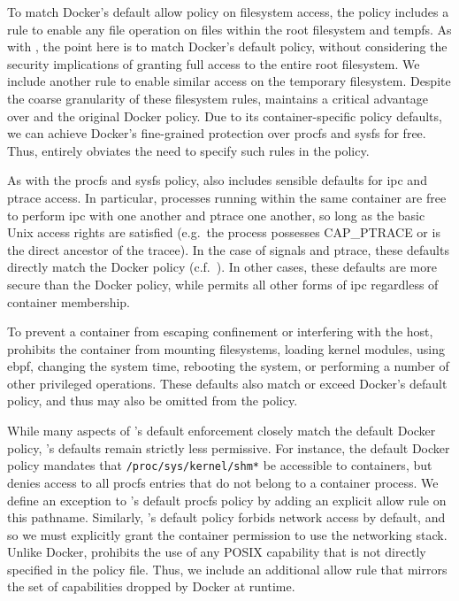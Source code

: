 To match Docker's default allow policy on filesystem access, the \bpfcontain{} policy
includes a rule to enable any file operation on files within the root filesystem and
tempfs.  As with \bpfbox{}, the point here is to match Docker's default policy, without
considering the security implications of granting full access to the entire root
filesystem. We include another rule to enable similar access on the temporary filesystem.
Despite the coarse granularity of these filesystem rules, \bpfcontain{} maintains
a critical advantage over \bpfbox{} and the original Docker policy. Due to its
container-specific policy defaults, we can achieve Docker's fine-grained protection over
procfs and sysfs for free. Thus, \bpfcontain{} entirely obviates the need to specify such
rules in the policy.

As with the procfs and sysfs policy, \bpfcontain{} also includes sensible defaults for
\gls{ipc} and ptrace access. In particular, processes running within the same container
are free to perform \gls{ipc} with one another and ptrace one another, so long as the
basic Unix access rights are satisfied (e.g.~the process possesses CAP\_PTRACE or is the
direct ancestor of the tracee). In the case of signals and ptrace, these defaults directly
match the Docker policy (c.f.~).  In other cases, these defaults
are more secure than the Docker policy, while permits all other forms of \gls{ipc}
regardless of container membership.

To prevent a container from escaping confinement or interfering with the host,
\bpfcontain{} prohibits the container from mounting filesystems, loading kernel modules,
using \gls{ebpf}, changing the system time, rebooting the system, or performing a number
of other privileged operations. These defaults also match or exceed Docker's default
policy, and thus may also be omitted from the \bpfcontain{} policy.

While many aspects of \bpfcontain{}'s default enforcement closely match the default Docker
policy, \bpfcontain{}'s defaults remain strictly less permissive. For instance, the
default Docker policy mandates that \texttt{/proc/sys/kernel/shm*} be accessible to
containers, but \bpfcontain{} denies access to all procfs entries that do not belong to
a container process. We define an exception to \bpfcontain{}'s default procfs policy by
adding an explicit allow rule on this pathname. Similarly, \bpfcontain{}'s default policy
forbids network access by default, and so we must explicitly grant the container
permission to use the networking stack. Unlike Docker, \bpfcontain{} prohibits the use of
any POSIX capability that is not directly specified in the policy file. Thus, we include
an additional allow rule that mirrors the set of capabilities dropped by Docker at
runtime.

